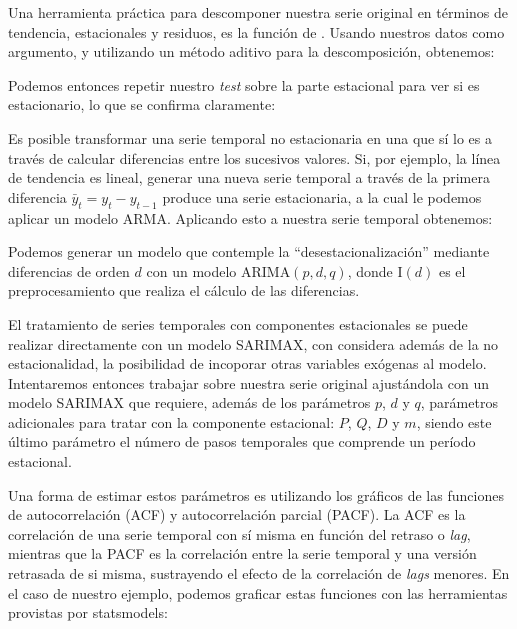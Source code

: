 Una herramienta práctica para descomponer nuestra serie original en términos de tendencia, estacionales y residuos, es la función  de . Usando nuestros datos  como argumento, y utilizando un método aditivo para la descomposición, obtenemos:

Podemos entonces repetir nuestro \textit{test} sobre la parte estacional para ver si es estacionario, lo que se confirma claramente:

Es posible transformar una serie temporal no estacionaria en una que sí lo es a través de calcular diferencias entre los sucesivos valores. Si, por ejemplo, la línea de tendencia es lineal, generar una nueva serie temporal a través de la primera diferencia $\bar{y}_t = y_t - y_{t-1}$ produce una serie estacionaria, a la cual le podemos aplicar un modelo ARMA. Aplicando esto a nuestra serie temporal obtenemos:


Podemos generar un modelo que contemple la ``desestacionalización'' mediante diferencias de orden $d$ con un modelo ARIMA$(p, d, q)$, donde I$(d)$ es el preprocesamiento que realiza el cálculo de las diferencias.

El tratamiento de series temporales con componentes estacionales se puede realizar directamente con un modelo SARIMAX, con considera además de la no estacionalidad, la posibilidad de incoporar otras variables exógenas al modelo. Intentaremos entonces trabajar sobre nuestra serie original ajustándola con un modelo SARIMAX que requiere, además de los parámetros $p$, $d$ y $q$, parámetros adicionales para tratar con la componente estacional: $P$, $Q$, $D$ y $m$, siendo este último parámetro el número de pasos temporales que comprende un período estacional.

Una forma de estimar estos parámetros es utilizando los gráficos de las funciones de autocorrelación (ACF) y autocorrelación parcial (PACF). La ACF es la correlación de una serie temporal con sí misma en función del retraso o \textit{lag}, mientras que la PACF es la correlación entre la serie temporal y una versión retrasada de si misma, sustrayendo el efecto de la correlación de \textit{lags} menores. En el caso de nuestro ejemplo, podemos graficar estas funciones con las herramientas provistas por statsmodels:

